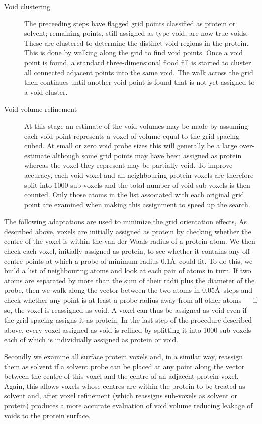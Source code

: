 \documentclass{article}
\begin{document}
\begin{description}
\item[Void clustering] The preceeding steps have flagged grid points
classified as protein or solvent; remaining points, still assigned as
type void, are now true voids. These are clustered to determine the
distinct void regions in the protein. This is done by walking along
the grid to find void points. Once a void point is found, a standard
three-dimensional flood fill is started to cluster all connected
adjacent points into the same void. The walk across the grid then
continues until another void point is found that is not yet assigned
to a void cluster.

\item[Void volume refinement] At this stage an estimate of the void
volumes may be made by assuming each void point represents a voxel of
volume equal to the grid spacing cubed. At small or zero void probe
sizes this will generally be a large over-estimate although some grid
points may have been assigned as protein whereas the voxel they
represent may be partially void. To improve accuracy, each void voxel
and all neighbouring protein voxels are therefore split into 1000
sub-voxels and the total number of void sub-voxels is then
counted. Only those atoms in the list associated with each original
grid point are examined when making this assignment to speed up the
search. 
\end{description}

The following adaptations are used to minimize the grid orientation
effects, As described above, voxels are initially assigned as protein
by checking whether the centre of the voxel is within the van der
Waals radius of a protein atom.  We then check each voxel, initially
assigned as protein, to see whether it contains any off-centre points
at which a probe of minimum radius 0.1\AA\ could fit. To do this, we
build a list of neighbouring atoms and look at each pair of atoms in
turn. If two atoms are separated by more than the sum of their radii
plus the diameter of the probe, then we walk along the vector between
the two atoms in 0.05\AA\ steps and check whether any point is at
least a probe radius away from all other atoms --- if so, the voxel is
reassigned as void. A voxel can thus be assigned as void even if the
grid spacing assigns it as protein.  In the last step of the procedure
described above, every voxel assigned as void is refined by splitting
it into 1000 sub-voxels each of which is individually assigned as
protein or void.

Secondly we examine all surface protein voxels and, in a similar way,
reassign them as solvent if a solvent probe can be placed at any point
along the vector between the centre of this voxel and the centre of an
adjacent protein voxel. Again, this allows voxels whose centres are
within the protein to be treated as solvent and, after voxel
refinement (which reassigns sub-voxels as solvent or protein) produces
a more accurate evaluation of void volume reducing leakage of voids to
the protein surface.
\end{document}

